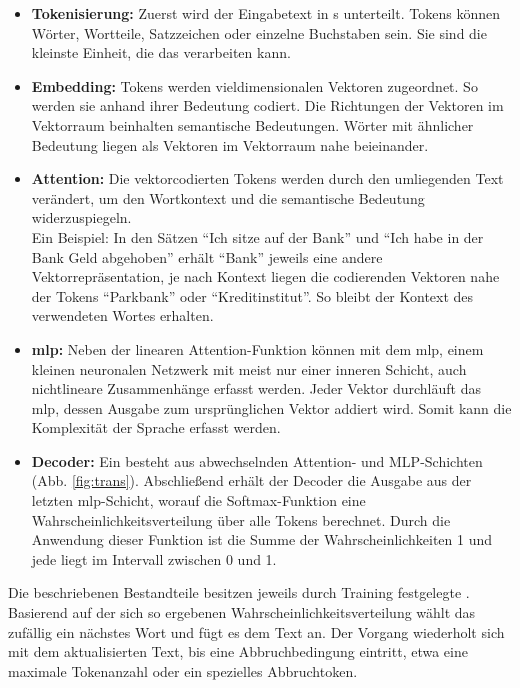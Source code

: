 \documentclass[../main.tex]{subfiles}
\begin{document}
\begin{itemize}

\item \textbf{Tokenisierung:} Zuerst wird der Eingabetext in s unterteilt. Tokens können Wörter, Wortteile, Satzzeichen oder einzelne Buchstaben sein. Sie sind die kleinste Einheit, 
die das  verarbeiten kann.\cite{architecture}

\item \textbf{Embedding:} Tokens werden vieldimensionalen Vektoren zugeordnet. So werden sie anhand ihrer Bedeutung codiert. Die Richtungen der Vektoren im
Vektorraum beinhalten semantische Bedeutungen. Wörter mit ähnlicher Bedeutung liegen als Vektoren im Vektorraum nahe beieinander.\cite{embedding}

\item \textbf{Attention:} Die vektorcodierten Tokens werden durch den umliegenden Text verändert, um den Wortkontext und die semantische Bedeutung widerzuspiegeln.\\
Ein Beispiel: In den Sätzen "`Ich sitze auf der Bank"' und "`Ich habe in der Bank Geld abgehoben"' erhält "`Bank"' jeweils eine andere Vektorrepräsentation, je nach Kontext liegen die codierenden 
Vektoren nahe der Tokens "`Parkbank"' oder "`Kreditinstitut"'. So bleibt der Kontext des verwendeten Wortes erhalten.\cite{attention, attention2} 

\item \textbf{\acrfull{mlp}:} Neben der linearen Attention-Funktion können mit dem \acrshort{mlp}, einem kleinen neuronalen Netzwerk mit meist nur einer inneren Schicht, auch nichtlineare Zusammenhänge 
erfasst werden. Jeder Vektor durchläuft das \acrshort{mlp}, dessen Ausgabe zum ursprünglichen Vektor addiert wird. Somit kann die Komplexität der Sprache erfasst werden.\cite{mlp}

\item \textbf{Decoder:} Ein  besteht aus abwechselnden Attention- und MLP-Schichten (Abb. \ref{fig:trans}). Abschließend erhält der Decoder die Ausgabe aus der letzten 
\acrshort{mlp}-Schicht, worauf die Softmax-Funktion eine Wahrscheinlichkeitsverteilung über alle Tokens berechnet. Durch die Anwendung dieser Funktion ist die Summe der Wahrscheinlichkeiten 1 und jede liegt im Intervall zwischen 0 und 1.\cite{architecture} 
\end{itemize}

Die beschriebenen Bestandteile besitzen jeweils durch Training festgelegte . Basierend auf der sich so ergebenen Wahrscheinlichkeitsverteilung wählt das  zufällig ein nächstes Wort und fügt es dem Text an. Der Vorgang wiederholt sich mit dem aktualisierten Text, 
bis eine Abbruchbedingung eintritt, etwa eine maximale Tokenanzahl oder ein spezielles Abbruchtoken.\cite{architecture}\\
\end{document}
